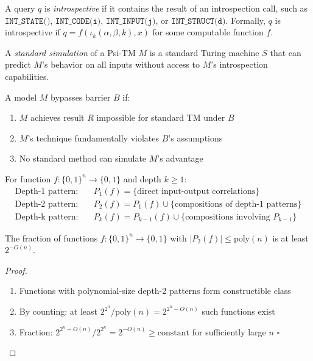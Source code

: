 \documentclass[11pt]{article}
\newcommand{\qed}{\hfill$\square$}
\begin{document}
\begin{definition}
A query $q$ is \textit{introspective} if it contains the result of an introspection call, such as $\texttt{INT\_STATE()}$, $\texttt{INT\_CODE(i)}$, $\texttt{INT\_INPUT(j)}$, or $\texttt{INT\_STRUCT(d)}$. Formally, $q$ is introspective if $q = f(\iota_k(\alpha, \beta, k), x)$ for some computable function $f$.
\end{definition}

\begin{definition}
A \textit{standard simulation} of a Psi-TM $M$ is a standard Turing machine $S$ that can predict $M$'s behavior on all inputs without access to $M$'s introspection capabilities.
\end{definition}

\begin{definition}
A model $M$ bypasses barrier $B$ if:
\begin{enumerate}
\item $M$ achieves result $R$ impossible for standard TM under $B$
\item $M$'s technique fundamentally violates $B$'s assumptions
\item No standard method can simulate $M$'s advantage
\end{enumerate}
\end{definition}

\begin{definition}
For function $f: \{0,1\}^n \to \{0,1\}$ and depth $k \geq 1$:
\begin{align}
\text{Depth-1 pattern:} &\quad P_1(f) = \{\text{direct input-output correlations}\}\\
\text{Depth-2 pattern:} &\quad P_2(f) = P_1(f) \cup \{\text{compositions of depth-1 patterns}\}\\
\text{Depth-k pattern:} &\quad P_k(f) = P_{k-1}(f) \cup \{\text{compositions involving } P_{k-1}\}
\end{align}
\end{definition}

\begin{theorem}
The fraction of functions $f: \{0,1\}^n \to \{0,1\}$ with $|P_2(f)| \leq \text{poly}(n)$ is at least $2^{-O(n)}$.
\end{theorem}
\begin{proof}
\begin{enumerate}
\item Functions with polynomial-size depth-2 patterns form constructible class
\item By counting: at least $2^{2^n}/\text{poly}(n) = 2^{2^n - O(n)}$ such functions exist
\item Fraction: $2^{2^n - O(n)}/2^{2^n} = 2^{-O(n)} \geq \text{constant}$ for sufficiently large $n$ \qed
\end{enumerate}
\end{proof}
\end{document}
